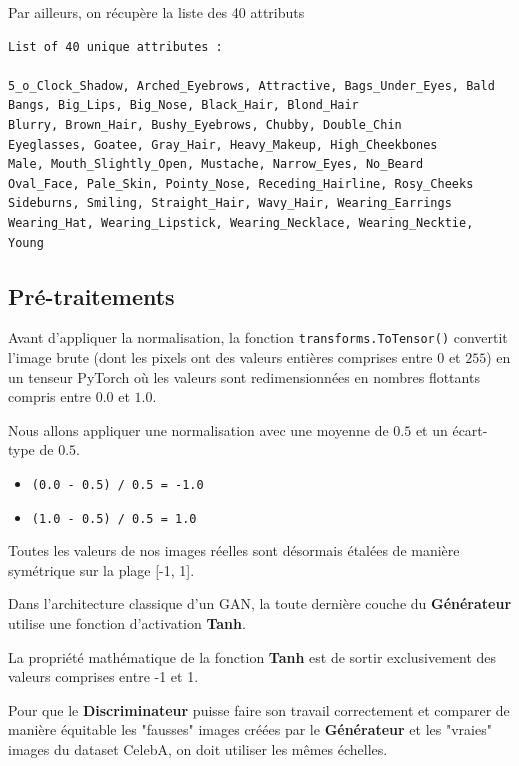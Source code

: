 \documentclass{article}
\newcommand{\code}[1]{\colorbox{light-gray}{\texttt{#1}}}
\begin{document}
\medskip

\noindent Par ailleurs, on récupère la liste des 40 attributs

\medskip
\begin{lstlisting}
List of 40 unique attributes :

5_o_Clock_Shadow, Arched_Eyebrows, Attractive, Bags_Under_Eyes, Bald
Bangs, Big_Lips, Big_Nose, Black_Hair, Blond_Hair
Blurry, Brown_Hair, Bushy_Eyebrows, Chubby, Double_Chin
Eyeglasses, Goatee, Gray_Hair, Heavy_Makeup, High_Cheekbones
Male, Mouth_Slightly_Open, Mustache, Narrow_Eyes, No_Beard
Oval_Face, Pale_Skin, Pointy_Nose, Receding_Hairline, Rosy_Cheeks
Sideburns, Smiling, Straight_Hair, Wavy_Hair, Wearing_Earrings
Wearing_Hat, Wearing_Lipstick, Wearing_Necklace, Wearing_Necktie, Young
\end{lstlisting}

\subsection{Pré-traitements}

Avant d'appliquer la normalisation, la fonction \code{transforms.ToTensor()} convertit l'image brute (dont les pixels ont des valeurs entières comprises entre $0$ et $255$) en un tenseur PyTorch où les valeurs sont redimensionnées en nombres flottants compris entre $0.0$ et $1.0$.

\noindent Nous allons appliquer une normalisation avec une moyenne de $0.5$ et un écart-type de $0.5$.
\begin{itemize}
    \item[\textbf{Pour un pixel noir ($0.0$) :}] \code{(0.0 - 0.5) / 0.5 = -1.0}
    \item[\textbf{Pour un pixel blanc ($1.0$) :}] \code{(1.0 - 0.5) / 0.5 = 1.0}
\end{itemize}


\noindent Toutes les valeurs de nos images réelles sont désormais étalées de manière symétrique sur la plage [-1, 1].

Dans l'architecture classique d'un GAN, la toute dernière couche du \textbf{Générateur} utilise une fonction d'activation \textbf{Tanh}. 

\noindent La propriété mathématique de la fonction \textbf{Tanh} est de sortir exclusivement des valeurs comprises entre -1 et 1. 

\noindent Pour que le \textbf{Discriminateur} puisse faire son travail correctement et comparer de manière équitable les "fausses" images créées par le \textbf{Générateur} et les "vraies" images du dataset CelebA, on doit utiliser les mêmes échelles.
\end{document}
